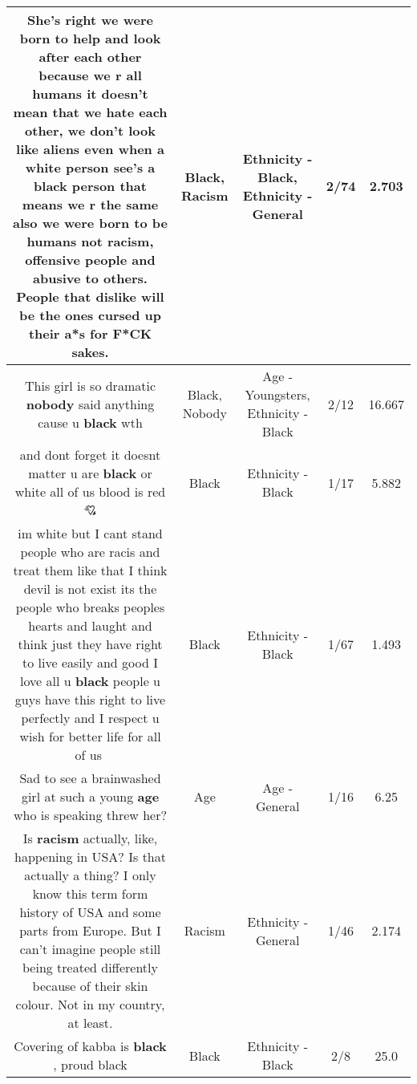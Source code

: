 \documentclass[11pt]{article}
\newlength\mylength
\begin{document}
\begin{center}
\begin{longtable}{|C{.65\mylength}|C{.30\mylength}|C{.12\mylength}|C{.12\mylength}|C{.12\mylength}|}
  \small She's right we were born to help and look after each other because we r all humans it doesn't mean that we hate each other, we don't look like aliens even when a white person see's a \textbf{black} person that means we r the same also we were born to be humans not \textbf{racism}, offensive people and abusive to others. People that dislike will be the ones cursed up their a*s for F*CK sakes.\normalsize   & Black, Racism & Ethnicity - Black, Ethnicity - General & 2/74 & 2.703 \\  \hline
  \small This girl is so dramatic \textbf{nobody} said anything cause u \textbf{black} wth\normalsize   & Black, Nobody & Age - Youngsters, Ethnicity - Black & 2/12 & 16.667 \\  \hline
  \small and dont forget it doesnt matter u are \textbf{black} or white all of us blood is red💘\normalsize   & Black & Ethnicity - Black & 1/17 & 5.882 \\  \hline
  \small im white but I cant stand people who are racis and treat them like that I think devil is not exist its the people who breaks peoples hearts and laught and think just they have right to live easily and good I love all u \textbf{black} people u guys have this right to live perfectly and I respect u wish for better life for all of us🌹\normalsize   & Black & Ethnicity - Black & 1/67 & 1.493 \\  \hline
  \small Sad to see a brainwashed girl at such a young \textbf{age} who is speaking threw her?\normalsize   & Age & Age - General & 1/16 & 6.25 \\  \hline
  \small Is \textbf{racism} actually, like, happening in USA? Is that actually a thing? I only know this term form history of USA and some parts from Europe. But I can't imagine people still being treated differently because of their skin colour. Not in my country, at least.\normalsize   & Racism & Ethnicity - General & 1/46 & 2.174 \\  \hline
  \small Covering of kabba is \textbf{black} , proud black\normalsize   & Black & Ethnicity - Black & 2/8 & 25.0 \\  \hline

\end{longtable}
\end{center}
\end{document}

